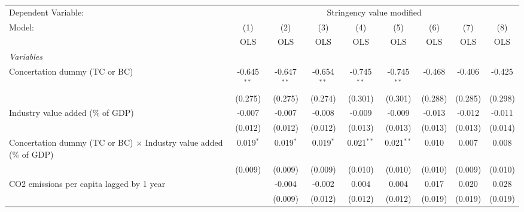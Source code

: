 
\begingroup
\centering
\begin{tabular}{lcccccccc}
   \toprule
   Dependent Variable: & \multicolumn{8}{c}{Stringency value modified}\\
   Model:                                                                    & (1)           & (2)           & (3)           & (4)           & (5)           & (6)          & (7)           & (8)\\  
                                                                             &  OLS          & OLS           & OLS           & OLS           & OLS           & OLS          & OLS           & OLS\\  
   \midrule
   \emph{Variables}\\
   Concertation dummy (TC or BC)                                             & -0.645$^{**}$ & -0.647$^{**}$ & -0.654$^{**}$ & -0.745$^{**}$ & -0.745$^{**}$ & -0.468       & -0.406        & -0.425\\   
                                                                             & (0.275)       & (0.275)       & (0.274)       & (0.301)       & (0.301)       & (0.288)      & (0.285)       & (0.298)\\   
   Industry value added (\% of GDP)                                          & -0.007        & -0.007        & -0.008        & -0.009        & -0.009        & -0.013       & -0.012        & -0.011\\   
                                                                             & (0.012)       & (0.012)       & (0.012)       & (0.013)       & (0.013)       & (0.013)      & (0.013)       & (0.014)\\   
   Concertation dummy (TC or BC) $\times$ Industry value added (\% of GDP)   & 0.019$^{*}$   & 0.019$^{*}$   & 0.019$^{*}$   & 0.021$^{**}$  & 0.021$^{**}$  & 0.010        & 0.007         & 0.008\\   
                                                                             & (0.009)       & (0.009)       & (0.009)       & (0.010)       & (0.010)       & (0.010)      & (0.009)       & (0.010)\\   
   CO2 emissions per capita lagged by 1 year                                 &               & -0.004        & -0.002        & 0.004         & 0.004         & 0.017        & 0.020         & 0.028\\   
                                                                             &               & (0.009)       & (0.012)       & (0.012)       & (0.012)       & (0.019)      & (0.019)       & (0.019)\\   

\end{tabular}
